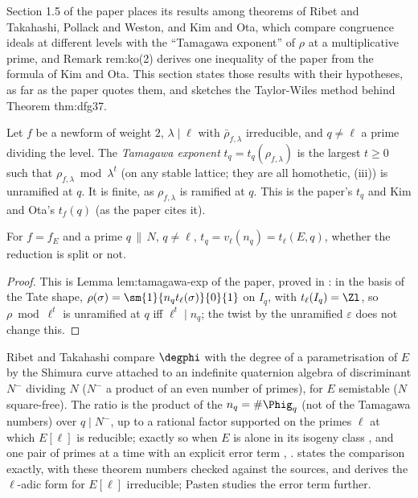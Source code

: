 Section 1.5 of the paper places its results among theorems of Ribet and Takahashi, Pollack and Weston, and Kim and Ota, which compare
congruence ideals at different levels with the ``Tamagawa exponent'' of $\rho$ at a multiplicative prime, and Remark rem:ko(2) derives one inequality of
the paper from the formula of Kim and Ota. This section states those results with their hypotheses, as far as the paper quotes them, and
sketches the Taylor-Wiles method behind Theorem thm:dfg37.

\begin{definition}\label{def:modgalrep:tamagawa-exponent}
Let $f$ be a newform of weight $2$, $\lambda\mid\ell$ with $\bar\rho_{f,\lambda}$ irreducible, and $q\ne\ell$ a prime dividing the level. The \emph{Tamagawa exponent} $t_q=t_q(\rho_{f,\lambda})$ is the
largest $t\ge0$ such that $\rho_{f,\lambda}\bmod\lambda^t$ (on any stable lattice; they are all homothetic, (iii)) is unramified at $q$. It is finite, as $\rho_{f,\lambda}$ is
ramified at $q$. This is the paper's $t_q$ and Kim and Ota's $t_f(q)$ \cite[Definition 2.12]{KimOta} (as the paper cites it).
\end{definition}

\begin{proposition}\label{prop:modgalrep:tamagawa-exponent}
For $f=f_E$ and a prime $q\,\|\,N$, $q\ne\ell$, $t_q=v_\ell(n_q)=t_\ell(E,q)$, whether the reduction is split or not.
\end{proposition}

\begin{proof}
This is Lemma lem:tamagawa-exp of the paper, proved in : in the basis of the Tate shape, $\rho(\sigma)=\sm{1}{n_qt_\ell(\sigma)}{0}{1}$ on $I_q$, with $t_\ell(I_q)=\Zl$, so
$\rho\bmod\ell^t$ is unramified at $q$ iff $\ell^t\mid n_q$; the twist by the unramified $\varepsilon$ does not change this.
\end{proof}

\begin{remark}\label{rem:modgalrep:ribet-takahashi}
Ribet and Takahashi \cite{RibetTakahashi97,Takahashi01} compare $\degphi$ with the degree of a parametrisation of $E$ by the Shimura curve attached to an indefinite
quaternion algebra of discriminant $N^-$ dividing $N$ ($N^-$ a product of an even number of primes), for $E$ semistable ($N$ square-free). The ratio is the product of the $n_q=\#\Phig_q$ (not
of the Tamagawa numbers) over $q\mid N^-$, up to a rational factor supported on the primes $\ell$ at which $E[\ell]$ is reducible; exactly so when $E$ is alone in its isogeny class
\cite[Corollary 3.5]{Takahashi01}, and one pair of primes at a time with an explicit error term \cite[Theorems 1 and 2]{RibetTakahashi97}, \cite[Theorem 3.2]{Takahashi01}.  states
the comparison exactly, with these theorem numbers checked against the sources, and derives the $\ell$-adic form for $E[\ell]$ irreducible; Pasten \cite{Pasten} studies the error term further.
\end{remark}

